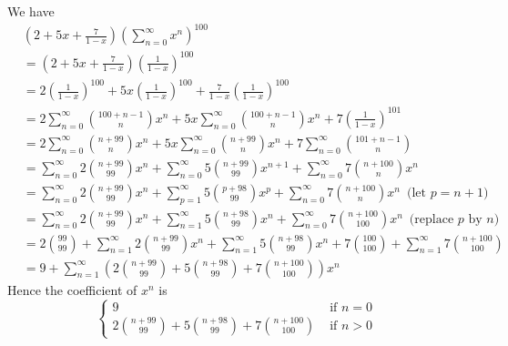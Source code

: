 
We have
\begin{align*}
&\left( 
2 + 5x + \frac{7}{1 - x}
\right)
\left( \sum_{n=0}^\infty x^n \right)^{100}
\\
&= \left( 
2 + 5x + \frac{7}{1 - x}
\right)
\left( \frac{1}{1 - x} \right)^{100}
\\
&=
2\left( \frac{1}{1 - x} \right)^{100}
+ 5x \left( \frac{1}{1 - x} \right)^{100}
+ \frac{7}{1 - x} \left( \frac{1}{1 - x} \right)^{100}
\\
&=
2 \sum_{n=0}^\infty \binom{100 + n - 1}{n} x^n
+ 5x \sum_{n=0}^\infty \binom{100 + n - 1}{n} x^n
+ 7 \left( \frac{1}{1 - x} \right)^{101} 
\\
&=
2 \sum_{n=0}^\infty \binom{n + 99}{n} x^n
+ 5x \sum_{n=0}^\infty \binom{n + 99}{n} x^n
+ 7 \sum_{n=0}^\infty \binom{101 + n - 1}{n}
\\
&=
\sum_{n=0}^\infty 2 \binom{n + 99}{99} x^n
+ \sum_{n=0}^\infty 5 \binom{n + 99}{99} x^{n+1}
+ \sum_{n=0}^\infty 7 \binom{n + 100}{n} x^n
\\
&=
\sum_{n=0}^\infty 2 \binom{n + 99}{99} x^n
+ \sum_{p=1}^\infty 5 \binom{p + 98}{99} x^{p}
+ \sum_{n=0}^\infty 7          \binom{n + 100}{n} x^n  \,\,\, \text{(let $p = n + 1$)}
\\
&=
\sum_{n=0}^\infty 2\binom{n + 99}{99} x^n
+ \sum_{n=1}^\infty 5 \binom{n + 98}{99} x^{n}  
+ \sum_{n=0}^\infty 7 \binom{n + 100}{100} x^n \,\,\,\text{(replace $p$ by $n$)}
\\
&=
2 \binom{99}{99} + \sum_{n=1}^\infty 2\binom{n + 99}{99} x^n
+ \sum_{n=1}^\infty 5\binom{n + 98}{99} x^{n} 
+ 7\binom{100}{100}  + \sum_{n=1}^\infty 7 \binom{n + 100}{100}  
\\
&=
9 +
\sum_{n=1}^\infty
\left( 2\binom{n + 99}{99} 
+  5\binom{n + 98}{99} 
+ 7 \binom{n + 100}{100}
\right) x^n
\end{align*}
Hence the coefficient of $x^n$ is
\[
\begin{cases}
9 & \text{ if } n = 0 \\
\displaystyle 2\binom{n + 99}{99} 
+  5\binom{n + 98}{99} 
+ 7 \binom{n + 100}{100} & \text{ if } n > 0
\end{cases}
\]

